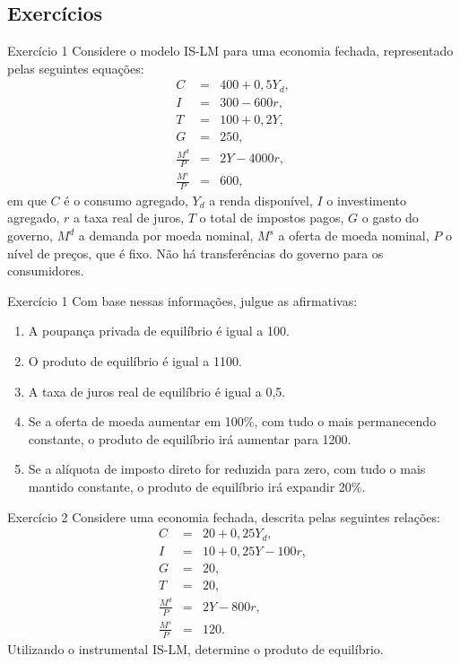 \documentclass[10pt]{beamer}
\begin{document}
\subsection{Exercícios}
\begin{frame}[t]{Exercício 1}
    Considere o modelo IS-LM para uma economia fechada, representado pelas seguintes equações:
    \begin{eqnarray*}
    C &=& 400 + 0,5Y_d, \\
    I &=& 300 - 600r, \\
    T &=& 100 + 0,2Y, \\
    G &=& 250, \\
    \frac{M^d}{P} &=& 2Y - 4000r, \\
    \frac{M^s}{P} &=& 600,
    \end{eqnarray*}
    em que $C$ é o consumo agregado, $Y_d$ a renda disponível, $I$ o investimento agregado, $r$ a taxa real de juros, $T$ o total de impostos pagos, $G$ o gasto do governo, $M^d$ a demanda por moeda nominal, $M^s$ a oferta de moeda nominal, $P$ o nível de preços, que é fixo. Não há transferências do governo para os consumidores.
\end{frame}

\begin{frame}[t]{Exercício 1}
Com base nessas informações, julgue as afirmativas:
\bigskip
\begin{enumerate}
    \item A poupança privada de equilíbrio é igual a 100.
    \bigskip
    \item O produto de equilíbrio é igual a 1100.
    \bigskip
    \item A taxa de juros real de equilíbrio é igual a 0,5.
    \bigskip
    \item Se a oferta de moeda aumentar em 100\%, com tudo o mais permanecendo constante, o produto de equilíbrio irá aumentar para 1200.
    \bigskip
    \item Se a alíquota de imposto direto for reduzida para zero, com tudo o mais mantido constante, o produto de equilíbrio irá expandir 20\%.
\end{enumerate}
\end{frame}

\begin{frame}[t]{Exercício 2}
Considere uma economia fechada, descrita pelas seguintes relações:
\begin{eqnarray*}
C &=& 20 + 0,25Y_d, \\
I &=& 10 + 0,25Y - 100r, \\
G &=& 20, \\
T &=& 20, \\
\frac{M^d}{P} &=& 2Y - 800r, \\
\frac{M^s}{P} &=& 120.
\end{eqnarray*}
Utilizando o instrumental IS-LM, determine o produto de equilíbrio.
\end{frame}
\end{document}
